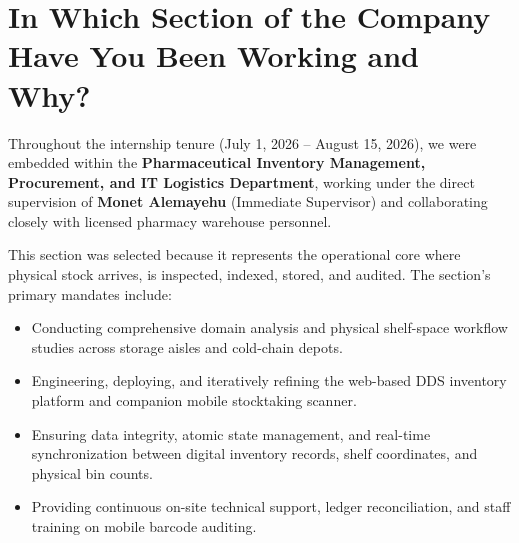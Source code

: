 \section{In Which Section of the Company Have You Been Working and Why?}
Throughout the internship tenure (July 1, 2026 -- August 15, 2026), we were embedded within the \textbf{Pharmaceutical Inventory Management, Procurement, and IT Logistics Department}, working under the direct supervision of \textbf{Monet Alemayehu} (Immediate Supervisor) and collaborating closely with licensed pharmacy warehouse personnel.

This section was selected because it represents the operational core where physical stock arrives, is inspected, indexed, stored, and audited. The section's primary mandates include:
\begin{itemize}
    \item Conducting comprehensive domain analysis and physical shelf-space workflow studies across storage aisles and cold-chain depots.
    \item Engineering, deploying, and iteratively refining the web-based DDS inventory platform and companion mobile stocktaking scanner.
    \item Ensuring data integrity, atomic state management, and real-time synchronization between digital inventory records, shelf coordinates, and physical bin counts.
    \item Providing continuous on-site technical support, ledger reconciliation, and staff training on mobile barcode auditing.
\end{itemize}

